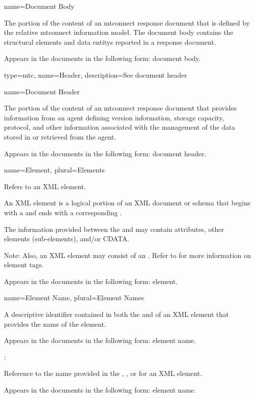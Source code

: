 {
  name={Document Body}
}
{
	The portion of the content of an \gls{mtconnect response document} that is defined by the relative \gls{mtconnect information model}. The \gls{document body} contains the \glspl{structural element} and \glspl{data entity} reported in a \gls{response document}.

	Appears in the documents in the following form: \gls{document body}.
}

{
  type=mtc,
  name={Header},
  description={See \gls{document header}}
}


{
  name={Document Header}
}
{
	The portion of the content of an \gls{mtconnect response document} that provides information from an \gls{agent} defining version information, storage capacity, protocol, and other information associated with the management of the data stored in or retrieved from the \gls{agent}.
	
	Appears in the documents in the following form: \gls{document header}.
}


{
  name={Element},
  plural={Elements}
}
{
	Refers to an XML element.

	An XML element is a logical portion of an XML document or schema that begins with a  and ends with a corresponding .  

	The information provided between the  and  may contain attributes, other elements (sub-elements), and/or CDATA.

    \begin{note}
	Note:  Also, an XML element may consist of an .  Refer to  for more information on element tags.
    \end{note}
    
	Appears in the documents in the following form: element.
}


{
  name={Element Name},
  plural={Element Names}
}
{
	A descriptive identifier contained in both the  and  of an XML element that provides the name of the element.

	Appears in the documents in the following form: element name.

	:

	Reference to the name provided in the , , or  for an XML element.

	Appears in the documents in the following form: \gls{element name}.
}


